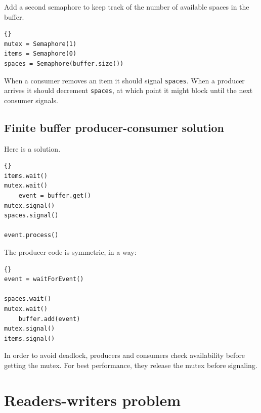 \documentclass{book}
\newcommand{\clearemptydoublepage}{\newpage\cleardoublepage}
\begin{document}
Add a second semaphore to keep track of the number of
available spaces in the buffer.

\begin{latin}
\begin{latin}
\begin{lstlisting}[title={Finite-buffer producer-consumer initialization}]{}
mutex = Semaphore(1)
items = Semaphore(0)
spaces = Semaphore(buffer.size())
\end{lstlisting}
\end{latin}
\end{latin}

When a consumer removes an item it should signal {\tt spaces}.
When a producer arrives it should decrement {\tt spaces}, at
which point it might block until the next consumer signals.


\clearemptydoublepage
\subsection{Finite buffer producer-consumer solution}

Here is a solution.

\begin{latin}
\begin{latin}
\begin{lstlisting}[title={Finite buffer consumer solution}]{}
items.wait()
mutex.wait()
    event = buffer.get()
mutex.signal()
spaces.signal()

event.process()
\end{lstlisting}
\end{latin}
\end{latin}

The producer code is symmetric, in a way:

\begin{latin}
\begin{latin}
\begin{lstlisting}[title={Finite buffer producer solution}]{}
event = waitForEvent()

spaces.wait()
mutex.wait()
    buffer.add(event)
mutex.signal()
items.signal()
\end{lstlisting}
\end{latin}
\end{latin}

In order to avoid deadlock, producers and consumers check
availability before getting the mutex.  For best performance,
they release the mutex before signaling.


\section{Readers-writers problem} 
\end{document}
